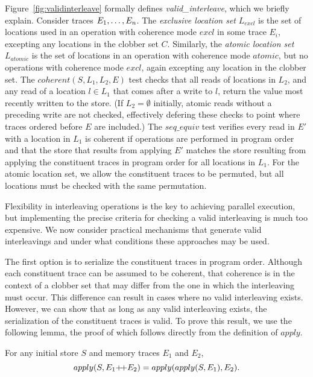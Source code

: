Figure~\ref{fig:validinterleave} formally defines {\em
valid\_interleave}, which we briefly explain.  Consider
traces ${E}_1,\ldots,{E}_n$.  The {\em exclusive location set} $L_{excl}$ is the
set of locations used in an operation with coherence mode $excl$ in
some trace $E_i$, excepting any locations in the clobber set $C$.
Similarly, the {\em atomic location set} $L_{atomic}$ is the set of
locations in an operation with coherence mode $atomic$, but no
operations with coherence mode $excl$, again excepting any location in
the clobber set.  The $coherent(S,L_1,L_2,E)$ test checks that all
reads of locations in $L_2$, and any read of a location $l \in L_1$
that comes after a write to $l$, return the value most recently written
to the store.  (If $L_2 = \emptyset$ initially, atomic reads without a preceding write are not checked, effectively defering
these checks to point where traces ordered before $E$ are included.)  The $seq\_equiv$
test verifies every read in $E'$ with a location in $L_1$ 
is coherent if operations are performed in 
program order and that the store that results from applying $E'$
matches the store resulting from applying the
constituent traces in program order for all locations in $L_1$.  For
the atomic location set, we allow the constituent traces to be
permuted, but all locations must be checked with the same permutation.

Flexibility in interleaving operations is the key to achieving parallel execution, but
implementing the precise criteria for checking a valid interleaving is
much too expensive.  We now consider practical mechanisms that generate valid interleavings and 
under what conditions these approaches may be used.

%
%
The first option is to serialize the constituent traces in program
order.  Although each constituent trace can be assumed to be coherent,
that coherence is in the context of a clobber set that may differ from
the one in which the interleaving must occur. 
This difference can result in cases where no valid interleaving
exists.  
%
%
However, we can show that as long as any valid interleaving
exists, the serialization of the constituent traces is valid.
To prove this result, we use the following lemma, the proof
of which follows directly from the definition of $apply$.

\begin{lem}
\label{lemma:applychain}
\rm
For any initial store $S$ and memory traces $E_1$ and $E_2$,
$$apply(S, E_1 \text{+\!+} E_2) = apply(apply(S, E_1), E_2).$$
\end{lem}


